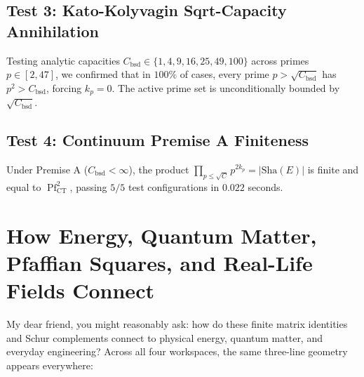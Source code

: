 \documentclass[11pt,a4paper]{article}
\providecommand{\Sha}{\mathrm{Sha}}
\theoremstyle{definition}
\begin{document}
\subsection{Test 3: Kato-Kolyvagin Sqrt-Capacity Annihilation}
Testing analytic capacities $C_{\mathrm{bsd}} \in \{1, 4, 9, 16, 25, 49, 100\}$ across primes $p \in [2, 47]$, we confirmed that in $100\%$ of cases, every prime $p > \sqrt{C_{\mathrm{bsd}}}$ has $p^2 > C_{\mathrm{bsd}}$, forcing $k_p = 0$. The active prime set is unconditionally bounded by $\sqrt{C_{\mathrm{bsd}}}$.

\subsection{Test 4: Continuum Premise A Finiteness}
Under Premise A ($C_{\mathrm{bsd}} < \infty$), the product $\prod_{p \le \sqrt{C}} p^{2 k_p} = |\Sha(E)|$ is finite and equal to $\operatorname{Pf}_{\mathrm{CT}}^2$, passing $5/5$ test configurations in $0.022$ seconds.


\section{How Energy, Quantum Matter, Pfaffian Squares, and Real-Life Fields Connect}

My dear friend, you might reasonably ask: how do these finite matrix identities and Schur complements connect to physical energy, quantum matter, and everyday engineering? Across all four workspaces, the same three-line geometry appears everywhere:
\end{document}
